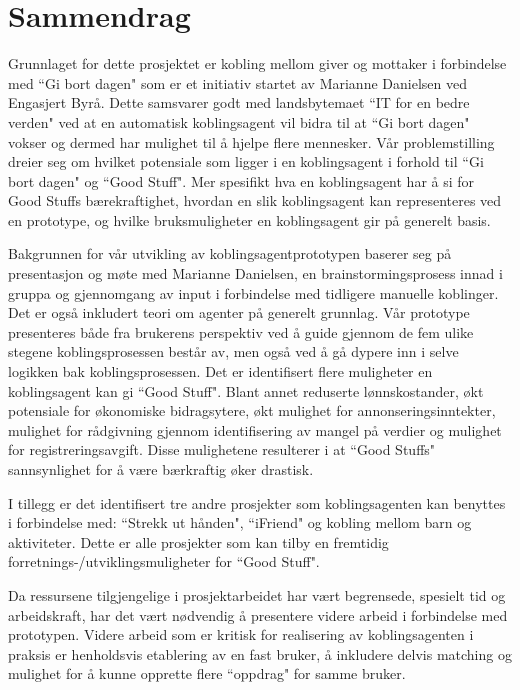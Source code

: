 \section*{Sammendrag}
Grunnlaget for dette prosjektet er kobling mellom giver og mottaker i forbindelse med ``Gi bort dagen" som er et initiativ startet av Marianne Danielsen ved Engasjert Byrå. Dette samsvarer godt med landsbytemaet ``IT for en bedre verden" ved at en automatisk koblingsagent vil bidra til at ``Gi bort dagen" vokser og dermed har mulighet til å hjelpe flere mennesker. Vår problemstilling dreier seg om hvilket potensiale som ligger i en koblingsagent i forhold til ``Gi bort dagen" og ``Good Stuff". Mer spesifikt hva en koblingsagent har å si for Good Stuffs bærekraftighet, hvordan en slik koblingsagent kan representeres ved en prototype, og hvilke bruksmuligheter en koblingsagent gir på generelt basis. 

Bakgrunnen for vår utvikling av koblingsagentprototypen baserer seg på presentasjon og møte med Marianne Danielsen, en brainstormingsprosess innad i gruppa og gjennomgang av input i forbindelse med tidligere manuelle koblinger. Det er også inkludert teori om agenter på generelt grunnlag. Vår prototype presenteres både fra brukerens perspektiv ved å guide gjennom de fem ulike stegene koblingsprosessen består av, men også ved å gå dypere inn i selve logikken bak koblingsprosessen. Det er identifisert flere muligheter en koblingsagent kan gi ``Good Stuff". Blant annet reduserte lønnskostander, økt potensiale for økonomiske bidragsytere, økt mulighet for annonseringsinntekter, mulighet for rådgivning gjennom identifisering av mangel på verdier og mulighet for registreringsavgift. Disse mulighetene resulterer i at ``Good Stuffs" sannsynlighet for å være bærkraftig øker drastisk. 

I tillegg er det identifisert tre andre prosjekter som koblingsagenten kan benyttes i forbindelse med: ``Strekk ut hånden", ``iFriend" og kobling mellom barn og aktiviteter. Dette er alle prosjekter som kan tilby en fremtidig forretnings-/utviklingsmuligheter for ``Good Stuff". 

Da ressursene tilgjengelige i prosjektarbeidet har vært begrensede, spesielt tid og arbeidskraft, har det vært nødvendig å presentere videre arbeid i forbindelse med prototypen. Videre arbeid som er kritisk for realisering av koblingsagenten i praksis er henholdsvis etablering av en fast bruker, å inkludere delvis matching og mulighet for å kunne opprette flere ``oppdrag" for samme bruker. 
